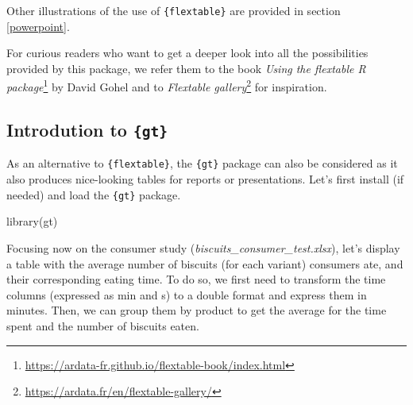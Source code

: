 \documentclass[
]{krantz}
\makeatletter
\newenvironment{Shaded}{\begin{snugshade}}{\end{snugshade}}
\newcommand{\FunctionTok}[1]{\textcolor[rgb]{0,0,0}{#1}}
\newcommand{\NormalTok}[1]{#1}
\renewcommand{\href}[2]{#2\footnote{\url{#1}}}
\newenvironment{kframe}{%
\medskip{}
\setlength{\fboxsep}{.8em}
 \def\at@end@of@kframe{}%
 \ifinner\ifhmode%
  \def\at@end@of@kframe{\end{minipage}}%
  \begin{minipage}{\columnwidth}%
 \fi\fi%
 \def\FrameCommand##1{\hskip\@totalleftmargin \hskip-\fboxsep
 \colorbox{shadecolor}{##1}\hskip-\fboxsep
     \hskip-\linewidth \hskip-\@totalleftmargin \hskip\columnwidth}%
 \MakeFramed {\advance\hsize-\width
   \@totalleftmargin\z@ \linewidth\hsize
   \@setminipage}}%
 {\par\unskip\endMakeFramed%
 \at@end@of@kframe}
\renewenvironment{Shaded}{\begin{kframe}}{\end{kframe}}
\makeatother
\begin{document}
\renewcommand*{\arraystretch}{1}

Other illustrations of the use of \texttt{\{flextable\}} are provided in section \ref{powerpoint}.

For curious readers who want to get a deeper look into all the possibilities provided by this package, we refer them to the book \href{https://ardata-fr.github.io/flextable-book/index.html}{\emph{Using the flextable R package}} by David Gohel and to \href{https://ardata.fr/en/flextable-gallery/}{\emph{Flextable gallery}} for inspiration.

\hypertarget{introdution-to-gt}{%
\subsection{\texorpdfstring{Introdution to \texttt{\{gt\}}}{Introdution to \{gt\}}}\label{introdution-to-gt}}

As an alternative to \texttt{\{flextable\}}, the \texttt{\{gt\}} package can also be considered as it also produces nice-looking tables for reports or presentations.
Let's first install (if needed) and load the \texttt{\{gt\}} package.

\begin{Shaded}
\begin{Highlighting}[]
\FunctionTok{library}\NormalTok{(gt)}
\end{Highlighting}
\end{Shaded}

Focusing now on the consumer study (\emph{biscuits\_consumer\_test.xlsx}), let's display a table with the average number of biscuits (for each variant) consumers ate, and their corresponding eating time. To do so, we first need to transform the time columns (expressed as min and s) to a double format and express them in minutes. Then, we can group them by product to get the average for the time spent and the number of biscuits eaten.
\end{document}
